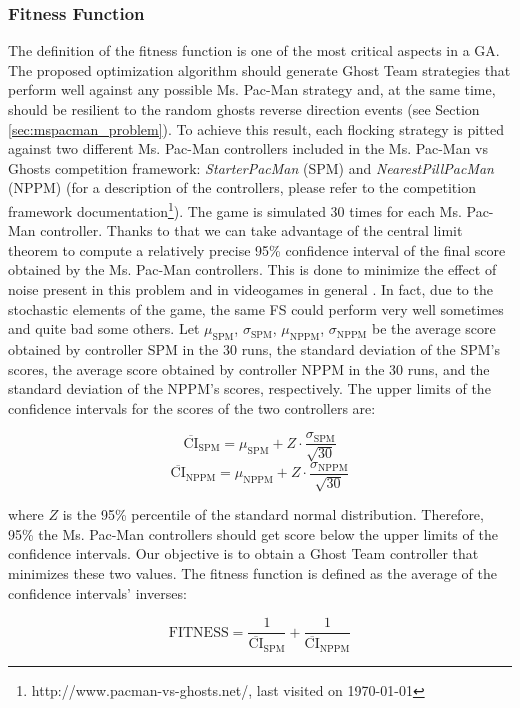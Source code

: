 \documentclass[a4paper]{llncs}
\begin{document}
\subsubsection{Fitness Function}
\label{subsubsec:GA_Fitness}
The definition of the fitness function is one of the most critical
aspects in a GA. The proposed optimization algorithm should generate
Ghost Team strategies that perform well against any possible
Ms. Pac-Man strategy and, at the same time, should be resilient to the
random ghosts reverse direction events (see Section
\ref{sec:mspacman_problem}). To achieve this result, each flocking
strategy is pitted against two different Ms. Pac-Man controllers
included in the Ms. Pac-Man vs Ghosts competition framework:
\textit{StarterPacMan} (SPM) and \textit{NearestPillPacMan}
(NPPM) (for a description of the controllers, please refer to the competition framework documentation\footnote{http://www.pacman-vs-ghosts.net/, last visited on {\today}}). The game is simulated 30 times for each Ms. Pac-Man
controller. Thanks to that we can take advantage of the central limit
theorem to compute a relatively precise 95\% confidence interval of
the final score obtained by the Ms. Pac-Man controllers. This is done to minimize the effect of noise present in this problem and in videogames in general \cite{Mora12}. In fact, due to the stochastic elements of the game, the same FS could perform very well sometimes and quite bad some others. Let $\mu_\mathrm{SPM}$, $\sigma_\mathrm{SPM}$, $\mu_\mathrm{NPPM}$, $\sigma_\mathrm{NPPM}$ be the average score obtained by controller SPM in the 30 runs, the standard deviation of the SPM's scores, the average score obtained by controller NPPM in the 30 runs, and the
standard deviation of the NPPM's scores, respectively. The upper limits of
the confidence intervals for the scores of the two controllers are:
\begin{small}
\begin{equation}
\overline{\mathrm{CI}}_\mathrm{SPM} = \mu_\mathrm{SPM} + Z \cdot \frac{\sigma_\mathrm{SPM}}{\sqrt{30}}
\end{equation}
\begin{equation}
\overline{\mathrm{CI}}_\mathrm{NPPM} = \mu_\mathrm{NPPM} + Z \cdot \frac{\sigma_\mathrm{NPPM}}{\sqrt{30}}
\end{equation}
\end{small}
where $Z$ is the 95\% percentile of the standard normal distribution. Therefore, 95\% the Ms. Pac-Man controllers should get score below the upper limits of
the confidence intervals. Our objective is to obtain a Ghost Team controller that minimizes these two values. The fitness function is defined as the average of the confidence intervals' inverses:
\begin{small}
\begin{equation}
\mathrm{FITNESS} = \frac{1}{\overline{\mathrm{CI}}_\mathrm{SPM}} + \frac{1}{\overline{\mathrm{CI}}_\mathrm{NPPM}}
\end{equation}
\end{small}
\end{document}
